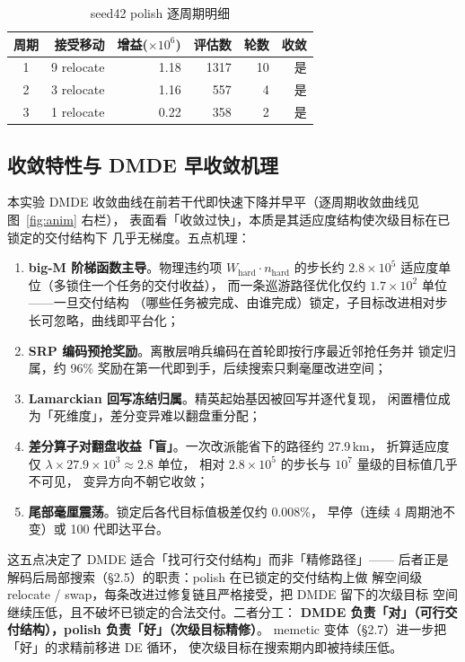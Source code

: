\documentclass[a4paper,11pt]{article}
\begin{document}
\begin{table}[H]
\centering
\caption{seed42 polish 逐周期明细}
\label{tab:polish_cyc}
\small
\begin{tabular}{crrrrr}
\toprule
周期 & 接受移动 & 增益($\times10^6$) & 评估数 & 轮数 & 收敛 \\
\midrule
1 & 9 relocate & 1.18 & 1317 & 10 & 是 \\
2 & 3 relocate & 1.16 & 557  & 4  & 是 \\
3 & 1 relocate & 0.22 & 358  & 2  & 是 \\
\bottomrule
\end{tabular}
\end{table}

\subsection{收敛特性与 DMDE 早收敛机理}
\label{sec:convergence}

本实验 DMDE 收敛曲线在前若干代即快速下降并早平（逐周期收敛曲线见
图~\ref{fig:anim} 右栏），
表面看「收敛过快」，本质是其适应度结构使次级目标在已锁定的交付结构下
几乎无梯度。五点机理：

\begin{enumerate}
  \item \textbf{big-M 阶梯函数主导}。物理违约项 $W_{\mathrm{hard}}\cdot n_{\mathrm{hard}}$
        的步长约 $2.8\times10^5$ 适应度单位（多锁住一个任务的交付收益），
        而一条巡游路径优化仅约 $1.7\times10^2$ 单位——一旦交付结构
        （哪些任务被完成、由谁完成）锁定，子目标改进相对步长可忽略，曲线即平台化；
  \item \textbf{SRP 编码预抢奖励}。离散层哨兵编码在首轮即按行序最近邻抢任务并
        锁定归属，约 96\% 奖励在第一代即到手，后续搜索只剩毫厘改进空间；
  \item \textbf{Lamarckian 回写冻结归属}。精英起始基因被回写并逐代复现，
        闲置槽位成为「死维度」，差分变异难以翻盘重分配；
  \item \textbf{差分算子对翻盘收益「盲」}。一次改派能省下的路径约 27.9\,km，
        折算适应度仅 $\lambda\times27.9\times10^3\approx 2.8$ 单位，
        相对 $2.8\times10^5$ 的步长与 $10^7$ 量级的目标值几乎不可见，
        变异方向不朝它收敛；
  \item \textbf{尾部毫厘震荡}。锁定后各代目标值极差仅约 0.008\%，
        早停（连续 4 周期池不变）或 100 代即达平台。
\end{enumerate}

这五点决定了 DMDE 适合「找可行交付结构」而非「精修路径」——
后者正是解码后局部搜索（\S 2.5）的职责：polish 在已锁定的交付结构上做
解空间级 relocate / swap，每条改进过修复链且严格接受，把 DMDE 留下的次级目标
空间继续压低，且不破坏已锁定的合法交付。二者分工：
\textbf{DMDE 负责「对」（可行交付结构），polish 负责「好」（次级目标精修）}。
memetic 变体（\S 2.7）进一步把「好」的求精前移进 DE 循环，
使次级目标在搜索期内即被持续压低。
\end{document}

